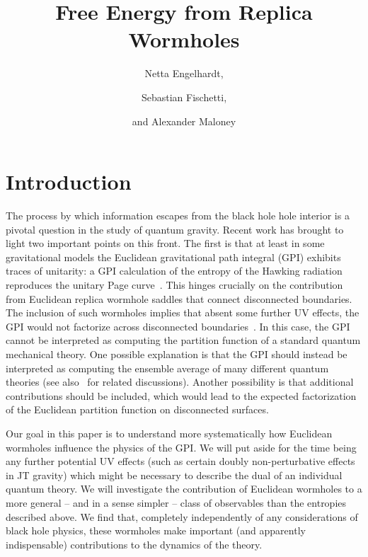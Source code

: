 \documentclass[12pt]{article}
\title{Free Energy from Replica Wormholes}
\author[1]{Netta Engelhardt,}
\author[2]{Sebastian Fischetti,}
\author[2]{and Alexander Maloney}
\affiliation[1]{Center for Theoretical Physics,\\
Massachusetts Institute of Technology, Cambridge, MA 02139, USA}
\affiliation[2]{Department of Physics, McGill University, Montr\'eal, QC, H3A 2T8, Canada}
\begin{document}
\newpage
\maketitle

\newpage

\section{Introduction}
\label{sec:intro}

The process by which information escapes from the black hole hole interior is a pivotal question in the study of quantum gravity.  Recent work has brought to light two important points on this front.  The first is that at least in some gravitational models the Euclidean gravitational path integral (GPI) exhibits traces of unitarity: a GPI calculation of the entropy of the Hawking radiation reproduces the unitary Page curve~\cite{Pen19, AEMM, BouTom19, PenShe19, AlmHar19, MarMax20, GidTur20, HarSha20, GauFri20}. This hinges crucially on the contribution from Euclidean replica wormhole saddles that connect disconnected boundaries.  The inclusion of such wormholes implies that absent some further UV effects, the GPI would not factorize across disconnected boundaries~\cite{Col88, GidStr88,GidStr88a, MalMao04, ArkOrg07}.  In this case, the GPI cannot be interpreted as computing the partition function of a standard quantum mechanical theory.  One possible explanation is that the GPI should instead be interpreted as computing the ensemble average of many different quantum theories (see also~\cite{HarJaf18,StaWit19, Ill19, KapMah19} for related discussions).  Another possibility is that additional contributions should be included, which would lead to the expected factorization of the Euclidean partition function on disconnected surfaces. 

Our goal in this paper is to understand more systematically how Euclidean wormholes influence the physics of the GPI.  We will put aside for the time being any further potential UV effects (such as certain doubly non-perturbative effects in JT gravity) which might be necessary to describe the dual of an individual quantum theory.  We will investigate the contribution of Euclidean wormholes to a more general -- and in a sense simpler -- class of observables than the entropies described above.  We find that, completely independently of any considerations of black hole physics, these wormholes make important (and apparently indispensable) contributions to the dynamics of the theory.
\end{document}

